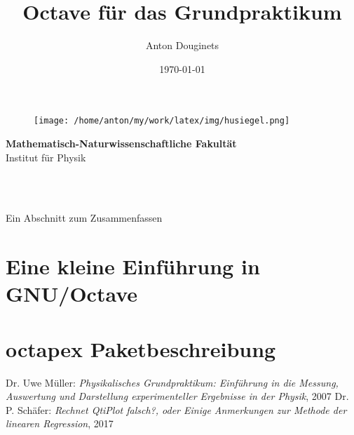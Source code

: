 \documentclass[a4paper,12pt]{article}
\title{Octave für das Grundpraktikum}
\author{Anton Douginets}
\date{\today}
\begin{document}
	\begin{titlepage}
		\thispagestyle{empty}
		\begin{figure}
			\texttt{[image: /home/anton/my/work/latex/img/husiegel.png]}
		\end{figure}
		\vspace*{-30mm}\hspace{-6mm}\textbf{\textcolor{pantone294}{\large{Mathematisch-Naturwissenschaftliche Fakultät}}}\\
		\textcolor{pantone294}{Institut für Physik}\\
		\vspace{20mm}
		\begin{center}
			\textcolor{pantone294}{\huge{\textbf{\thetitle}}}\\\vspace*{10mm}
			\textcolor{pantone294}{\thedate}\\\vspace*{10mm}
		\end{center}
		\tableofcontents

		\vspace{1cm}

		Ein Abschnitt zum Zusammenfassen
	\end{titlepage}
	\makeatother
	\newpage

	\section{Eine kleine Einführung in GNU/Octave}

	\section{octapex Paketbeschreibung}

	\begin{thebibliography}{}
	Dr. Uwe Müller: \textit{Physikalisches Grundpraktikum: Einführung in die Messung, Auswertung und Darstellung experimenteller Ergebnisse in der Physik}, 2007
	 Dr. P. Schäfer: \textit{Rechnet QtiPlot falsch?, oder Einige Anmerkungen zur Methode der linearen Regression}, 2017


	\end{thebibliography}
\end{document}
